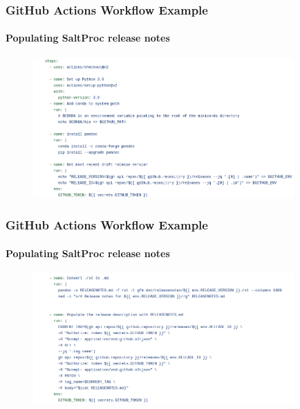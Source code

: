 \begin{frame}
    \frametitle{GitHub Actions Workflow Example}
    \framesubtitle{Populating SaltProc release notes}

    \begin{figure}[htpb]
        \centering
        \includegraphics[width=10cm]{images/github_actions_workflow_ex2}
    \end{figure}
\end{frame}

\begin{frame}
    \frametitle{GitHub Actions Workflow Example}
    \framesubtitle{Populating SaltProc release notes}

    \begin{figure}[htpb]
        \centering
        \includegraphics[width=10cm]{images/github_actions_workflow_ex3}
    \end{figure}
\end{frame}


